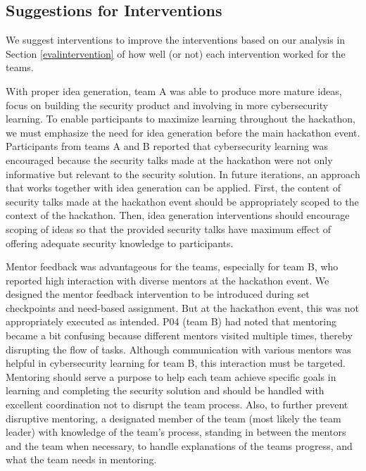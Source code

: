 \documentclass[runningheads]{llncs}
\begin{document}
\subsection{Suggestions for Interventions}
We suggest interventions to improve the interventions based on our analysis in Section \ref{evalintervention} of how well (or not) each intervention worked for the teams.

With proper idea generation, team A was able to produce more mature ideas, focus on building the security product and involving in more cybersecurity learning. 
To enable participants to maximize learning throughout the hackathon, we must emphasize the need for idea generation before the main hackathon event.
Participants from teams A and B reported that cybersecurity learning was encouraged because the security talks made at the hackathon were not only informative but relevant to the security solution. 
In future iterations, an approach that works together with idea generation can be applied. 
First, the content of security talks made at the hackathon event should be appropriately scoped to the context of the hackathon.
Then, idea generation interventions should encourage scoping of ideas so that the provided security talks have maximum effect of offering adequate security knowledge to participants.

Mentor feedback was advantageous for the teams, especially for team B, who reported high interaction with diverse mentors at the hackathon event. We designed the mentor feedback intervention to be introduced during set checkpoints and need-based assignment. But at the hackathon event, this was not appropriately executed as intended. P04 (team B) had noted that mentoring became a bit confusing because different mentors visited multiple times, thereby disrupting the flow of tasks. Although communication with various mentors was helpful in cybersecurity learning for team B, this interaction must be targeted. Mentoring should serve a purpose to help each team achieve specific goals in learning and completing the security solution and should be handled with excellent coordination not to disrupt the team process. 
Also, to further prevent disruptive mentoring, a designated member of the team (most likely the team leader) with knowledge of the team's process, standing in between the mentors and the team when necessary, to handle explanations of the teams progress, and what the team needs in mentoring. 
\end{document}
